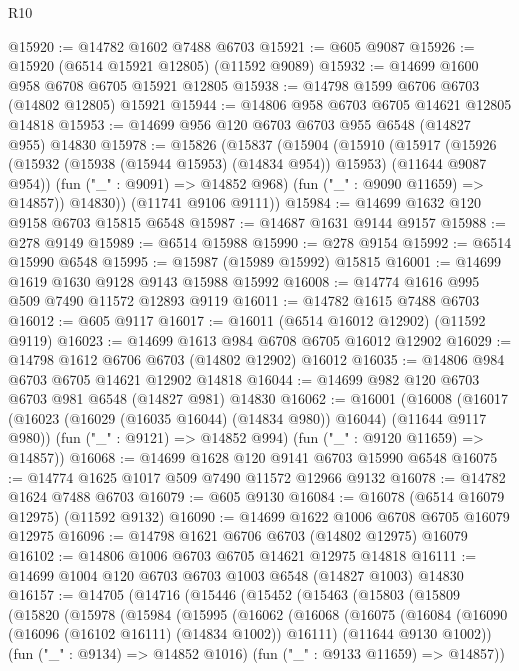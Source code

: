 \begin{lexlean}{R10}
\begin{coremodule}
@15920 := @14782 @1602 @7488 @6703
@15921 := @605 @9087
@15926 := @15920 (@6514 @15921 @12805) (@11592 @9089)
@15932 := @14699 @1600 @958 @6708 @6705 @15921 @12805
@15938 := @14798 @1599 @6706 @6703 (@14802 @12805) @15921
@15944 := @14806 @958 @6703 @6705 @14621 @12805 @14818
@15953 := @14699 @956 @120 @6703 @6703 @955 @6548 (@14827 @955) @14830
@15978 := @15826
    (@15837
      (@15904
        (@15910
          (@15917
            (@15926 (@15932 (@15938 (@15944 @15953) (@14834 @954)) @15953) (@11644 @9087 @954))
            (fun ("_" : @9091) => @14852 @968)
            (fun ("_" : @9090 @11659) => @14857))
          @14830))
      (@11741 @9106 @9111))
@15984 := @14699 @1632 @120 @9158 @6703 @15815 @6548
@15987 := @14687 @1631 @9144 @9157
@15988 := @278 @9149
@15989 := @6514 @15988
@15990 := @278 @9154
@15992 := @6514 @15990 @6548
@15995 := @15987 (@15989 @15992) @15815
@16001 := @14699 @1619 @1630 @9128 @9143 @15988 @15992
@16008 := @14774 @1616 @995 @509 @7490 @11572 @12893 @9119
@16011 := @14782 @1615 @7488 @6703
@16012 := @605 @9117
@16017 := @16011 (@6514 @16012 @12902) (@11592 @9119)
@16023 := @14699 @1613 @984 @6708 @6705 @16012 @12902
@16029 := @14798 @1612 @6706 @6703 (@14802 @12902) @16012
@16035 := @14806 @984 @6703 @6705 @14621 @12902 @14818
@16044 := @14699 @982 @120 @6703 @6703 @981 @6548 (@14827 @981) @14830
@16062 := @16001
    (@16008
      (@16017 (@16023 (@16029 (@16035 @16044) (@14834 @980)) @16044) (@11644 @9117 @980))
      (fun ("_" : @9121) => @14852 @994)
      (fun ("_" : @9120 @11659) => @14857))
@16068 := @14699 @1628 @120 @9141 @6703 @15990 @6548
@16075 := @14774 @1625 @1017 @509 @7490 @11572 @12966 @9132
@16078 := @14782 @1624 @7488 @6703
@16079 := @605 @9130
@16084 := @16078 (@6514 @16079 @12975) (@11592 @9132)
@16090 := @14699 @1622 @1006 @6708 @6705 @16079 @12975
@16096 := @14798 @1621 @6706 @6703 (@14802 @12975) @16079
@16102 := @14806 @1006 @6703 @6705 @14621 @12975 @14818
@16111 := @14699 @1004 @120 @6703 @6703 @1003 @6548 (@14827 @1003) @14830
@16157 := @14705
    (@14716
      (@15446
        (@15452
          (@15463
            (@15803
              (@15809
                (@15820
                  (@15978
                    (@15984
                      (@15995
                        (@16062
                          (@16068
                            (@16075
                              (@16084
                                (@16090 (@16096 (@16102 @16111) (@14834 @1002)) @16111)
                                (@11644 @9130 @1002))
                              (fun ("_" : @9134) => @14852 @1016)
                              (fun ("_" : @9133 @11659) => @14857))

\end{coremodule}
\end{lexlean}
